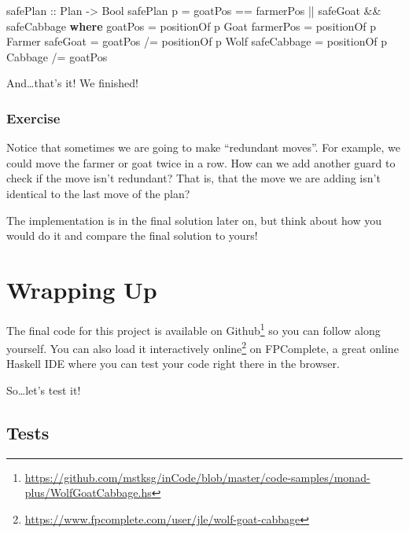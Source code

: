 \documentclass[]{article}
\newenvironment{Shaded}{}{}
\newcommand{\DataTypeTok}[1]{\textcolor[rgb]{0.56,0.13,0.00}{#1}}
\newcommand{\FunctionTok}[1]{\textcolor[rgb]{0.02,0.16,0.49}{#1}}
\newcommand{\KeywordTok}[1]{\textcolor[rgb]{0.00,0.44,0.13}{\textbf{#1}}}
\newcommand{\NormalTok}[1]{#1}
\newcommand{\OtherTok}[1]{\textcolor[rgb]{0.00,0.44,0.13}{#1}}
\renewcommand{\href}[2]{#2\footnote{\url{#1}}}
\begin{document}
\begin{Shaded}
\begin{Highlighting}[]
\OtherTok{safePlan ::} \DataTypeTok{Plan} \OtherTok{->} \DataTypeTok{Bool}
\NormalTok{safePlan p }\FunctionTok{=}\NormalTok{ goatPos }\FunctionTok{==}\NormalTok{ farmerPos }\FunctionTok{||}\NormalTok{ safeGoat }\FunctionTok{&&}\NormalTok{ safeCabbage}
    \KeywordTok{where}
\NormalTok{        goatPos     }\FunctionTok{=}\NormalTok{ positionOf p }\DataTypeTok{Goat}
\NormalTok{        farmerPos   }\FunctionTok{=}\NormalTok{ positionOf p }\DataTypeTok{Farmer}
\NormalTok{        safeGoat    }\FunctionTok{=}\NormalTok{ goatPos }\FunctionTok{/=}\NormalTok{ positionOf p }\DataTypeTok{Wolf}
\NormalTok{        safeCabbage }\FunctionTok{=}\NormalTok{ positionOf p }\DataTypeTok{Cabbage} \FunctionTok{/=}\NormalTok{ goatPos}
\end{Highlighting}
\end{Shaded}

And\ldots{}that's it! We finished!

\hypertarget{exercise}{%
\subsubsection{Exercise}\label{exercise}}

Notice that sometimes we are going to make ``redundant moves''. For example, we
could move the farmer or goat twice in a row. How can we add another guard to
check if the move isn't redundant? That is, that the move we are adding isn't
identical to the last move of the plan?

The implementation is in the final solution later on, but think about how you
would do it and compare the final solution to yours!

\hypertarget{wrapping-up}{%
\section{Wrapping Up}\label{wrapping-up}}

The final code for this project is available
\href{https://github.com/mstksg/inCode/blob/master/code-samples/monad-plus/WolfGoatCabbage.hs}{on
Github} so you can follow along yourself. You can also
\href{https://www.fpcomplete.com/user/jle/wolf-goat-cabbage}{load it
interactively online} on FPComplete, a great online Haskell IDE where you can
test your code right there in the browser.

So\ldots{}let's test it!

\hypertarget{tests}{%
\subsection{Tests}\label{tests}}
\end{document}
